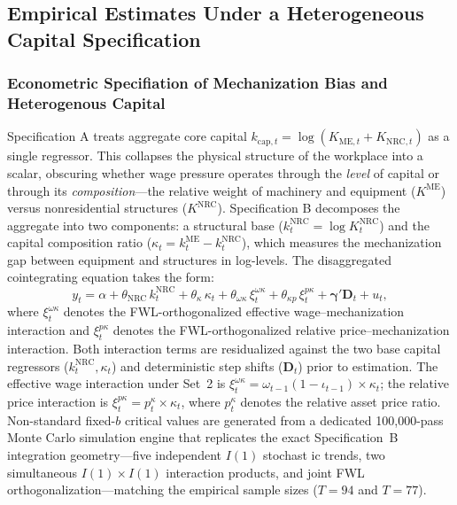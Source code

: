 \subsection{Empirical Estimates Under a Heterogeneous Capital Specification}
\label{sec:432:specB_results}

\subsubsection{Econometric Specifiation of Mechanization Bias and Heterogenous Capital}
Specification A treats aggregate core capital $k_{\text{cap},t} = \log(K_{\text{ME},t} + K_{\text{NRC},t})$ as a single regressor. This collapses the physical structure of the workplace into a scalar, obscuring whether wage pressure operates through the \emph{level} of capital or through its \emph{composition}---the relative weight of machinery and equipment ($K^{\text{ME}}$) versus nonresidential structures ($K^{\text{NRC}}$). Specification B decomposes the aggregate into two components: a structural base ($k^{\text{NRC}}_t = \log K^{\text{NRC}}_t$) and the capital composition ratio ($\kappa_t = k^{\text{ME}}_t - k^{\text{NRC}}_t$), which measures the mechanization gap between equipment and structures in log-levels. The disaggregated cointegrating equation takes the form:
\begin{equation}
	y_t = \alpha + \theta_{\text{NRC}}\, k^{\text{NRC}}_t + \theta_\kappa\, \kappa_t + \theta_{\omega\kappa}\, \xi^{\omega\kappa}_t + \theta_{\kappa p}\, \xi^{p\kappa}_t + \boldsymbol{\gamma}' \mathbf{D}_t + u_t,
	\label{eq:432:specB_model}
\end{equation}
where $\xi^{\omega\kappa}_t$ denotes the FWL-orthogonalized effective wage--mechanization interaction and $\xi^{p\kappa}_t$ denotes the FWL-orthogonalized relative price--mechanization interaction. Both interaction terms are residualized against the two base capital regressors ($k^{\text{NRC}}_t, \kappa_t$) and deterministic step shifts ($\mathbf{D}_t$) prior to estimation. The effective wage interaction under Set~2 is $\xi^{\omega\kappa}_t = \omega_{t-1}(1-\iota_{t-1}) \times \kappa_t$; the relative price interaction is $\xi^{p\kappa}_t = p^{\kappa}_t \times \kappa_t$, where $p^{\kappa}_t$ denotes the relative asset price ratio. Non-standard fixed-$b$ critical values are generated from a dedicated 100,000-pass Monte Carlo simulation engine that replicates the exact Specification~B integration geometry---five independent $I(1)$ stochast
ic trends, two simultaneous $I(1) \times I(1)$ interaction products, and joint FWL orthogonalization---matching the empirical sample sizes ($T = 94$ and $T = 77$).

